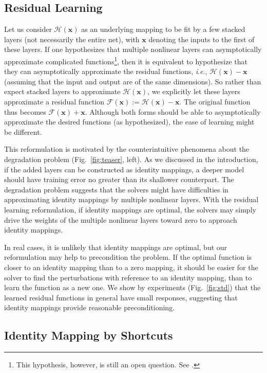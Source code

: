 \documentclass{article}
\newcommand{\ie}{\textit{i}.\textit{e}.}
\newcommand{\ve}[1]{\mathbf{#1}} %
\begin{document}
\subsection{Residual Learning}
\label{sec:motivation}

Let us consider $\mathcal{H}(\ve{x})$ as an underlying mapping to be fit by a few stacked layers (not necessarily the entire net), with $\ve{x}$ denoting the inputs to the first of these layers. If one hypothesizes that multiple nonlinear layers can asymptotically approximate complicated functions\footnote{This hypothesis, however, is still an open question. See \cite{Montufar2014}.}, then it is equivalent to hypothesize that they can asymptotically approximate the residual functions, \ie, $\mathcal{H}(\ve{x})-\ve{x}$ (assuming that the input and output are of the same dimensions).
So rather than expect stacked layers to approximate $\mathcal{H}(\ve{x})$, we explicitly let these layers approximate a residual function $\mathcal{F}(\ve{x}):=\mathcal{H}(\ve{x})-\ve{x}$. The original function thus becomes $\mathcal{F}(\ve{x})+\ve{x}$. Although both forms should be able to asymptotically approximate the desired functions (as hypothesized), the ease of learning might be different.

This reformulation is motivated by the counterintuitive phenomena about the degradation problem (Fig.~\ref{fig:teaser}, left). As we discussed in the introduction, if the added layers can be constructed as identity mappings, a deeper model should have training error no greater than its shallower counterpart. The degradation problem suggests that the solvers might have difficulties in approximating identity mappings by multiple nonlinear layers. With the residual learning reformulation, if identity mappings are optimal, the solvers may simply drive the weights of the multiple nonlinear layers toward zero to approach identity mappings.

In real cases, it is unlikely that identity mappings are optimal, but our reformulation may help to precondition the problem. If the optimal function is closer to an identity mapping than to a zero mapping, it should be easier for the solver to find the perturbations with reference to an identity mapping, than to learn the function as a new one. We show by experiments (Fig.~\ref{fig:std}) that the learned residual functions in general have small responses, suggesting that identity mappings provide reasonable preconditioning.

\subsection{Identity Mapping by Shortcuts}
\end{document}
